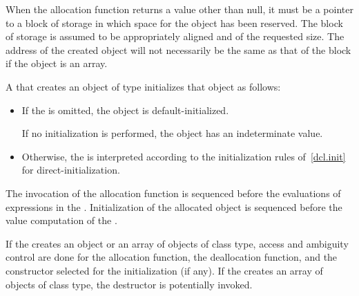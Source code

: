 \pnum
\begin{note}
When the allocation function returns a value other than null, it must be
a pointer to a block of storage in which space for the object has been
reserved. The block of storage is assumed to be appropriately aligned
and of the requested size. The address of the created object will not
necessarily be the same as that of the block if the object is an array.
\end{note}

\pnum
{}%
%
%
%
A  that creates an object of type 
initializes that object as follows:
\begin{itemize}
\item If the  is omitted, the object is
default-initialized.
\begin{note}
If no initialization
is performed, the object has an indeterminate value.
\end{note}

\item Otherwise, the  is interpreted according to
the initialization rules of~\ref{dcl.init} for direct-initialization.
\end{itemize}

\pnum
{}%
%
The invocation of the allocation function is sequenced before
the evaluations of expressions in the . Initialization of
the allocated object is sequenced before the
%
value computation of the
.

\pnum
If the  creates an object or an array of
objects of class type, access and ambiguity control are done for the
allocation function, the deallocation function, and
the constructor selected for the initialization (if any).
If the 
creates an array of objects of class type, the destructor is potentially
invoked.

